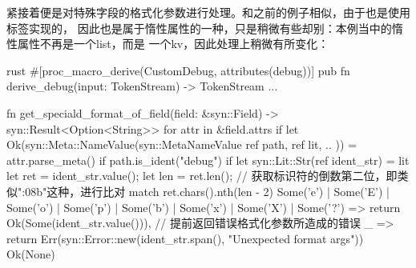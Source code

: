 紧接着便是对特殊字段的格式化参数进行处理。和之前的例子相似，由于也是使用标签实现的，
因此也是属于惰性属性的一种，只是稍微有些却别：本例当中的惰性属性不再是一个list，而是
一个kv，因此处理上稍微有所变化：
\begin{code-block}{rust}
#[proc_macro_derive(CustomDebug, attributes(debug))]
pub fn derive_debug(input: TokenStream) -> TokenStream {
    ...
}

fn get_speciald_format_of_field(field: &syn::Field) -> syn::Result<Option<String>> {
    for attr in &field.attrs {
        if let Ok(syn::Meta::NameValue(syn::MetaNameValue {
            ref path, ref lit, ..
        })) = attr.parse_meta()
        {
            if path.is_ident("debug") {
                if let syn::Lit::Str(ref ident_str) = lit {
                    let ret = ident_str.value();
                    let len = ret.len();
                    // 获取标识符的倒数第二位，即类似"{:08b}"这种，进行比对
                    match ret.chars().nth(len - 2) {
                        Some('e') | Some('E') | Some('o') | Some('p') | Some('b') | Some('x')
                        | Some('X') | Some('?') => return Ok(Some(ident_str.value())),
                        // 提前返回错误格式化参数所造成的错误
                        _ => {
                            return Err(syn::Error::new(ident_str.span(), "Unexpected format args"))
                        }
                    }
                }
            }
        }
    }
    Ok(None)
}
\end{code-block}

